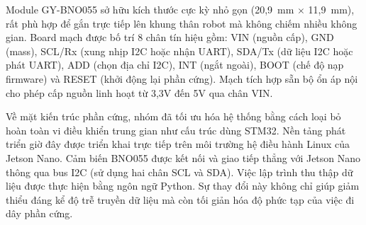 Module GY-BNO055 sở hữu kích thước cực kỳ nhỏ gọn (20,9~mm $\times$ 11,9~mm), rất phù hợp để gắn trực tiếp lên khung thân robot mà không chiếm nhiều không gian. Board mạch được bố trí 8 chân tín hiệu gồm: VIN (nguồn cấp), GND (mass), SCL/Rx (xung nhịp I2C hoặc nhận UART), SDA/Tx (dữ liệu I2C hoặc phát UART), ADD (chọn địa chỉ I2C), INT (ngắt ngoài), BOOT (chế độ nạp firmware) và RESET (khởi động lại phần cứng). Mạch tích hợp sẵn bộ ổn áp nội cho phép cấp nguồn linh hoạt từ 3,3V đến 5V qua chân VIN.

Về mặt kiến trúc phần cứng, nhóm đã tối ưu hóa hệ thống bằng cách loại bỏ hoàn toàn vi điều khiển trung gian như cấu trúc dùng STM32. Nền tảng phát triển giờ đây được triển khai trực tiếp trên môi trường hệ điều hành Linux của Jetson Nano. Cảm biến BNO055 được kết nối và giao tiếp thẳng với Jetson Nano thông qua bus I2C (sử dụng hai chân SCL và SDA). Việc lập trình thu thập dữ liệu được thực hiện bằng ngôn ngữ Python. Sự thay đổi này không chỉ giúp giảm thiểu đáng kể độ trễ truyền dữ liệu mà còn tối giản hóa độ phức tạp của việc đi dây phần cứng.

